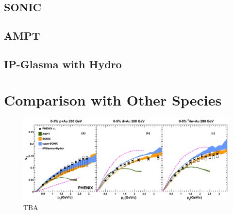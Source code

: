 \subsection{SONIC}
\subsection{AMPT}
\subsection{IP-Glasma with Hydro}
\section{Comparison with Other Species}
\begin{figure}
\begin{center}
\includegraphics[width=0.6\linewidth]{figs/indepth_theory_comparison.png}
\caption{TBA}
\end{center}
\end{figure}
